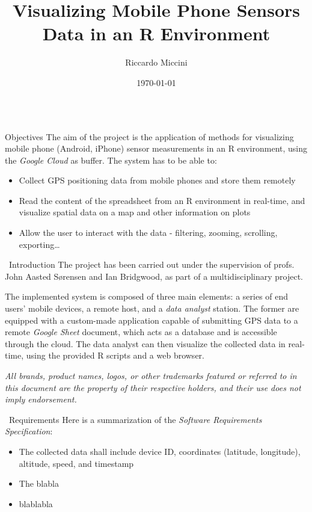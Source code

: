 \documentclass[final]{beamer}
\title{Visualizing Mobile Phone Sensors Data in an R Environment}
\author{Riccardo Miccini}
\institute{Technical University of Denmark - DTU}
\date{\today}
\newlength{\onecolwid}
\begin{document}
\begin{frame}[t]
\begin{columns}[t]

\begin{column}{\onecolwid}
	\begin{alertblock}{Objectives}
		The aim of the project is the application of methods for visualizing mobile phone (Android, iPhone) sensor measurements in an R environment, using the \emph{Google Cloud} as buffer.
		The system has to be able to:
		\begin{itemize}
			\item Collect GPS positioning data from mobile phones and store them remotely
			\item Read the content of the spreadsheet from an R environment in real-time, and visualize spatial data on a map and other information on plots
			\item Allow the user to interact with the data - filtering, zooming, scrolling, exporting\dots
		\end{itemize}
	\end{alertblock}

	\begin{block}{\faCommenting \, Introduction}
		The project has been carried out under the supervision of profs. John Aasted S{\o}rensen and Ian Bridgwood, as part of a multidisciplinary project.

		The implemented system is composed of three main elements: a series of end users' mobile devices, a remote host, and a \emph{data analyst} station.
		The former are equipped with a custom-made application capable of submitting GPS data to a remote \emph{Google Sheet} document, which acts as a database and is accessible through the cloud.
		The data analyst can then visualize the collected data in real-time, using the provided R scripts and a web browser.

		\bigskip

		\emph{All brands, product names, logos, or other trademarks featured or referred to in this document are the property of their respective holders, and their use does not imply endorsement.}
	\end{block}

	\begin{block}{\faListUl \, Requirements}
		Here is a summarization of the \emph{Software Requirements Specification}:
		\begin{itemize}
			\item The collected data shall include device ID, coordinates (latitude, longitude), altitude, speed, and timestamp
			\item The blabla
			\item blablabla
		\end{itemize}
	\end{block}
\end{column}


\end{columns}
\end{frame}
\end{document}
